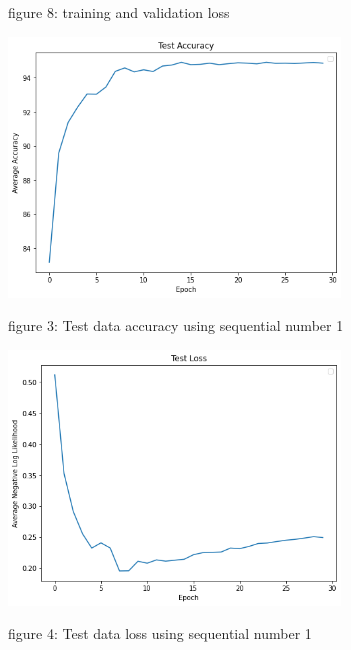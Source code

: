 \documentclass{homework}
\begin{document}
{figure 8: training and validation loss}

\raggedright

\newpage

\centering
\includegraphics[width=250pt]{Testdata_accuracy.png}

{figure 3: Test data accuracy using sequential number 1}

\centering
\includegraphics[width=250pt]{testdata_loss.png}

{figure 4: Test data loss using sequential number 1}

\raggedright
\end{document}
